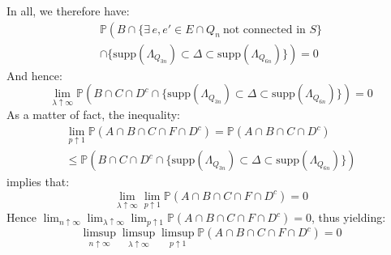 \documentclass[10pt,a4paper]{amsart}
\theoremstyle{exampstyle}
\theoremstyle{exampnotations}
\begin{document}
In all, we therefore have:
\begin{gather*}
    \mathbb{P}\left(B  \cap \Big\lbrace \exists \, e,e' \in E\cap Q_n \: \text{not connected in } S  \Big\rbrace \right. \\ \left. \cap \Big\lbrace \text{supp}(\Lambda_{Q_{3n}}) \subset \Delta \subset \text{supp}(\Lambda_{Q_{6n}}) \Big\rbrace  \right) = 0
\end{gather*}
And hence:
\begin{equation*}
   \lim_{\lambda \uparrow \infty} \mathbb{P}\left(B \cap C \cap D^c  \cap \Big\lbrace \text{supp}(\Lambda_{Q_{3n}}) \subset \Delta \subset \text{supp}(\Lambda_{Q_{6n}}) \Big\rbrace \right) = 0 
\end{equation*}
As a matter of fact, the inequality:
\begin{gather*}
    \lim_{p \uparrow 1} \mathbb{P}(A \cap B \cap C \cap F \cap D^{c})  = \mathbb{P}(A \cap B \cap C \cap D^c)  \\ \leq \mathbb{P}\left(B \cap C \cap D^c  \cap \Big\lbrace \text{supp}(\Lambda_{Q_{3n}}) \subset \Delta \subset \text{supp}(\Lambda_{Q_{6n}}) \Big\rbrace \right)
\end{gather*}
implies that:
\begin{equation*}
     \lim_{\lambda \uparrow \infty}\lim_{p \uparrow 1} \mathbb{P}(A \cap B \cap C \cap F \cap D^{c}) = 0
\end{equation*}
Hence $\lim_{n \uparrow \infty}\lim_{\lambda \uparrow \infty}\lim_{p \uparrow 1} \mathbb{P}(A \cap B \cap C \cap F \cap D^{c}) = 0$, thus yielding:
\begin{equation}
    \label{eq21}
    \limsup_{n \uparrow \infty}\limsup_{\lambda \uparrow \infty}\limsup_{p \uparrow 1} \mathbb{P}(A \cap B \cap C \cap F \cap D^{c}) = 0
\end{equation}
\end{document}
